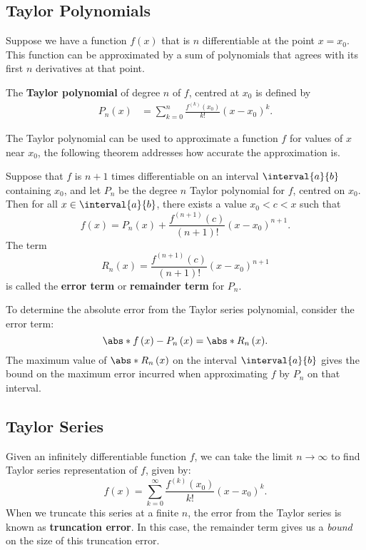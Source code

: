 \documentclass{article}
\begin{document}
\subsection{Taylor Polynomials}
Suppose we have a function \(f\left( x \right)\) that is \(n\) differentiable at the point
\(x = x_0\). This function can be approximated by a sum of polynomials that agrees with its first \(n\) derivatives at that point.
\begin{definition}
    The \textbf{Taylor polynomial} of degree \(n\) of \(f\), centred at \(x_0\) is defined by
    \begin{align*}
        P_n\left( x \right) & = \sum_{k = 0}^n \frac{f^{\left( k \right)}\left( x_0 \right)}{k!} \left( x - x_0 \right)^k.
    \end{align*}
\end{definition}
The Taylor polynomial can be used to approximate a function \(f\) for values of \(x\) near \(x_0\), the following
theorem addresses how accurate the approximation is.
\begin{definition}
    Suppose that \(f\) is \(n + 1\) times differentiable on an interval \(\interval{a}{b}\) containing \(x_0\),
    and let \(P_n\) be the degree \(n\) Taylor polynomial for \(f\), centred on \(x_0\). Then for all \(x \in \interval{a}{b}\),
    there exists a value \(x_0 < c < x\) such that
    \begin{equation*}
        f\left( x \right) = P_n\left( x \right) + \frac{f^{\left( n + 1 \right)}\left( c \right)}{\left( n + 1 \right)!} \left( x - x_0 \right)^{n + 1}.
    \end{equation*}
    The term
    \begin{equation*}
        R_n\left( x \right) = \frac{f^{\left( n + 1 \right)}\left( c \right)}{\left( n + 1 \right)!} \left( x - x_0 \right)^{n + 1}
    \end{equation*}
    is called the \textbf{error term} or \textbf{remainder term} for \(P_n\).
\end{definition}
To determine the absolute error from the Taylor series polynomial, consider the error term:
\begin{equation*}
    \abs*{f\left( x \right) - P_n\left( x \right)} = \abs*{R_n\left( x \right)}.
\end{equation*}
The maximum value of \(\abs*{R_n\left( x \right)}\) on the interval \(\interval{a}{b}\) gives the bound on the maximum error incurred when approximating
\(f\) by \(P_n\) on that interval.
\subsection{Taylor Series}
Given an infinitely differentiable function \(f\), we can take the limit \(n \to \infty\) to find Taylor series representation of \(f\), given by:
\begin{equation*}
    f\left( x \right) = \sum_{k = 0}^\infty \frac{f^{\left( k \right)}\left( x_0 \right)}{k!} \left( x - x_0 \right)^k.
\end{equation*}
When we truncate this series at a finite \(n\), the error from the Taylor series is known as \textbf{truncation error}. In this case,
the remainder term gives us a \textit{bound} on the size of this truncation error.
\end{document}
